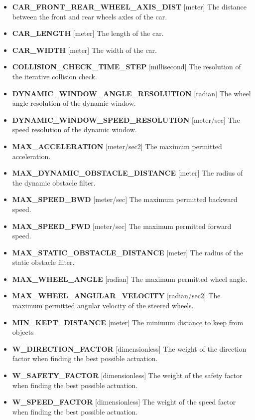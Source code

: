 \begin{minipage}{\textwidth}
\begin{itemize}
\item\textbf{CAR\_FRONT\_REAR\_WHEEL\_AXIS\_DIST} [meter] The distance between the front and rear wheels axles of the car.
\item\textbf{CAR\_LENGTH} [meter] The length of the car.
\item\textbf{CAR\_WIDTH} [meter] The width of the car.
\item\textbf{COLLISION\_CHECK\_TIME\_STEP} [millisecond] The resolution of the iterative collision check.
\item\textbf{DYNAMIC\_WINDOW\_ANGLE\_RESOLUTION} [radian] The wheel angle resolution of the dynamic window.
\item\textbf{DYNAMIC\_WINDOW\_SPEED\_RESOLUTION} [meter/sec] The speed resolution of the dynamic window.
\item\textbf{MAX\_ACCELERATION} [meter/sec2] The maximum permitted acceleration.
\item\textbf{MAX\_DYNAMIC\_OBSTACLE\_DISTANCE} [meter] The radius of the dynamic obstacle filter.
\item\textbf{MAX\_SPEED\_BWD} [meter/sec] The maximum permitted backward speed.
\item\textbf{MAX\_SPEED\_FWD} [meter/sec] The maximum permitted forward speed.
\item\textbf{MAX\_STATIC\_OBSTACLE\_DISTANCE} [meter] The radius of the static obstacle filter.
\item\textbf{MAX\_WHEEL\_ANGLE} [radian] The maximum permitted wheel angle. 
\item\textbf{MAX\_WHEEL\_ANGULAR\_VELOCITY} [radian/sec2] The maximum permitted angular velocity of the steered wheels.
\item\textbf{MIN\_KEPT\_DISTANCE} [meter] The minimum distance to keep from objects
\item\textbf{W\_DIRECTION\_FACTOR} [dimensionless] The weight of the direction factor when finding the best possible actuation.
\item\textbf{W\_SAFETY\_FACTOR} [dimensionless] The weight of the safety factor when finding the best possible actuation.
\item\textbf{W\_SPEED\_FACTOR} [dimensionless] The weight of the speed factor when finding the best possible actuation.
\end{itemize}
\end{minipage}

